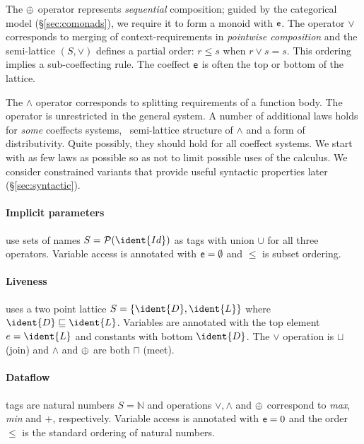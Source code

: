 The $\oplus$ operator represents \emph{sequential} composition; guided by the categorical
model (\S\ref{sec:comonads}), we require it to form a monoid with $\mathsf{e}$.
The operator $\vee$ corresponds to merging of context-requirements in \emph{pointwise composition} 
and the semi-lattice $(S, \vee)$ defines a partial order: $r \leq s$ when 
$r \vee s = s$. This ordering implies a sub-coeffecting rule.  
The coeffect $\mathsf{e}$ is often the top or bottom of the lattice.

The $\wedge$ operator corresponds to splitting requirements of a function body. 
The operator is unrestricted in the general system.
A number of additional laws holds for \emph{some} coeffects systems, \eg{}~semi-lattice structure of
$\wedge$ and a form of distributivity. Quite possibly, they should hold for all coeffect systems.  
We start with as few laws as possible so as not to limit possible uses of the calculus.  
We consider constrained variants that provide useful syntactic properties later (\S\ref{sec:syntactic}).


\vspace{-0.4em}
\paragraph{Implicit parameters} use sets of names $S = \mathcal{P}(\ident{Id})$ as tags with
union $\cup$ for all three operators. Variable access is annotated with $\mathsf{e} = \emptyset$
and $\leq$ is subset ordering.

\vspace{-0.4em}
\paragraph{Liveness} uses a two point lattice $S=\{ \ident{D}, \ident{L} \}$ where
$\ident{D} \sqsubseteq \ident{L}$. Variables are annotated with the top element $e = \ident{L}$ 
and constants with bottom $\ident{D}$. The $\vee$ operation is $\sqcup$ (join) and $\wedge$
and $\oplus$ are both $\sqcap$ (meet).

\vspace{-0.4em}
\paragraph{Dataflow} tags are natural numbers $S = \mathbb{N}$ and operations
$\vee, \wedge$ and $\oplus$ correspond to \textit{max}, \textit{min} and $+$, respectively. 
Variable access is annotated with $\mathsf{e} = 0$ and the order $\leq$ is the standard ordering
of natural numbers.

